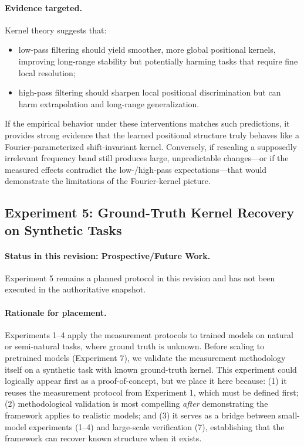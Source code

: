 \documentclass[11pt]{article}
\theoremstyle{definition}
\begin{document}
\paragraph{Evidence targeted.}
Kernel theory suggests that:
\begin{itemize}
    \item low-pass filtering should yield smoother, more global positional kernels, improving long-range stability but potentially harming tasks that require fine local resolution;
    \item high-pass filtering should sharpen local positional discrimination but can harm extrapolation and long-range generalization.
\end{itemize}
If the empirical behavior under these interventions matches such predictions, it provides strong evidence that the learned positional structure truly behaves like a Fourier-parameterized shift-invariant kernel. Conversely, if rescaling a supposedly irrelevant frequency band still produces large, unpredictable changes—or if the measured effects contradict the low-/high-pass expectations—that would demonstrate the limitations of the Fourier-kernel picture.

\subsection{Experiment 5: Ground-Truth Kernel Recovery on Synthetic Tasks}
\label{sec:exp-synthetic-kernel}

\paragraph{Status in this revision: \textbf{Prospective/Future Work}.}
Experiment 5 remains a planned protocol in this revision and has not been executed in the authoritative snapshot.

\paragraph{Rationale for placement.}
Experiments 1--4 apply the measurement protocols to trained models on natural or semi-natural tasks, where ground truth is unknown. Before scaling to pretrained models (Experiment 7), we validate the measurement methodology itself on a synthetic task with known ground-truth kernel. This experiment could logically appear first as a proof-of-concept, but we place it here because: (1) it reuses the measurement protocol from Experiment 1, which must be defined first; (2) methodological validation is most compelling \emph{after} demonstrating the framework applies to realistic models; and (3) it serves as a bridge between small-model experiments (1--4) and large-scale verification (7), establishing that the framework can recover known structure when it exists.
\end{document}
